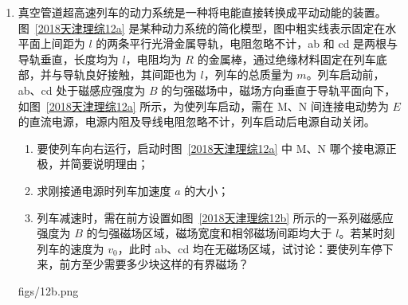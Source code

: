 \documentclass[\gkver]{gaokaozhenti}
\begin{document}
\begin{enumerate}
{设粒子进入磁场时速度方向与 ab 的夹角为 $\theta$，即圆弧所对圆心角的一半，由几何关系可知

$\tan\theta = \frac{\sqrt{3}R}{r' - R}$⑥

粒子从 Q 射出后在电场中做类平抛运动，在电场方向上的分运动和从 P 释放后的运动情况相同，所以粒子进入磁场时沿竖直方向的速度同样为 $v$，在垂直于电场方向的分速度始终为 $v_{0}$，由运动的合成和分解可知

$\tan\theta = \frac{v}{v_{0}}$⑦

联立①⑤⑥⑦式得 $v_{0} = \frac{qBR}{m}$。
}

\item
真空管道超高速列车的动力系统是一种将电能直接转换成平动动能的装置。图~\ref{2018天津理综12a} 是某种动力系统的简化模型，图中粗实线表示固定在水平面上间距为 $l$ 的两条平行光滑金属导轨，电阻忽略不计，ab 和 cd 是两根与导轨垂直，长度均为 $l$，电阻均为 $R$ 的金属棒，通过绝缘材料固定在列车底部，并与导轨良好接触，其间距也为 $l$，列车的总质量为 $m$。列车启动前，ab、cd 处于磁感应强度为 $B$ 的匀强磁场中，磁场方向垂直于导轨平面向下，如图~\ref{2018天津理综12a} 所示，为使列车启动，需在 M、N 间连接电动势为 $E$ 的直流电源，电源内阻及导线电阻忽略不计，列车启动后电源自动关闭。
\begin{enumerate}
	\item
	要使列车向右运行，启动时图~\ref{2018天津理综12a} 中 M、N 哪个接电源正极，并简要说明理由；
	\item
	求刚接通电源时列车加速度 $a$ 的大小；
	\item
	列车减速时，需在前方设置如图~\ref{2018天津理综12b} 所示的一系列磁感应强度为 $B$ 的匀强磁场区域，磁场宽度和相邻磁场间距均大于 $l$。若某时刻列车的速度为 $v_{0}$，此时 ab、cd 均在无磁场区域，试讨论：要使列车停下来，前方至少需要多少块这样的有界磁场？
\end{enumerate}
{figs/12b.png}

\end{enumerate}
\end{document}
